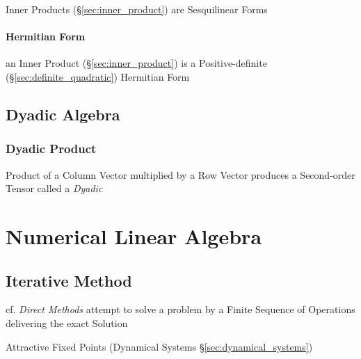 Inner Products (\S\ref{sec:inner_product}) are Sesquilinear Forms



\paragraph{Hermitian Form}\label{sec:hermitian_form}\hfill

an Inner Product (\S\ref{sec:inner_product}) is a Positive-definite
(\S\ref{sec:definite_quadratic}) Hermitian Form



\subsection{Dyadic Algebra}\label{sec:dyadic_algebra}

\subsubsection{Dyadic Product}\label{sec:dyadic_product}

Product of a Column Vector multiplied by a Row Vector produces a Second-order
Tensor called a \emph{Dyadic}



\section{Numerical Linear Algebra}\label{sec:numerical_linear_algebra}

\subsection{Iterative Method}\label{sec:iterative_method}


cf. \emph{Direct Methods} attempt to solve a problem by a Finite Sequence of
Operations delivering the exact Solution

Attractive Fixed Points (Dynamical Systems \S\ref{sec:dynamical_systems})



